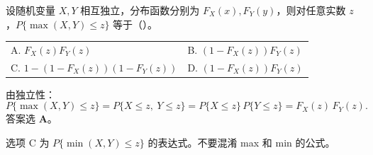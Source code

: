\documentclass[lang=cn,11pt]{elegantbook}
\begin{document}
\begin{exercise}[独立性选择题] \label{exer:3-12d}
设随机变量 $X, Y$ 相互独立，分布函数分别为 $F_X(x), F_Y(y)$，则对任意实数 $z$，$P\{\max(X,Y) \leqslant z\}$ 等于（\quad）。\\
\begin{tabular}{ll}
A. $F_X(z)F_Y(z)$ & B. $(1-F_X(z))F_Y(z)$ \\
C. $1-(1-F_X(z))(1-F_Y(z))$ & D. $(1-F_X(z))F_Y(z)$
\end{tabular}
\end{exercise}
\begin{solution}
由独立性：
\[
P\{\max(X,Y) \leqslant z\} = P\{X \leqslant z,\ Y \leqslant z\} = P\{X \leqslant z\}\,P\{Y \leqslant z\} = F_X(z)\,F_Y(z).
\]
答案选 \textbf{A}。
\begin{note}
选项 C 为 $P\{\min(X,Y) \leqslant z\}$ 的表达式。不要混淆 max 和 min 的公式。
\end{note}
\end{solution}
\end{document}
